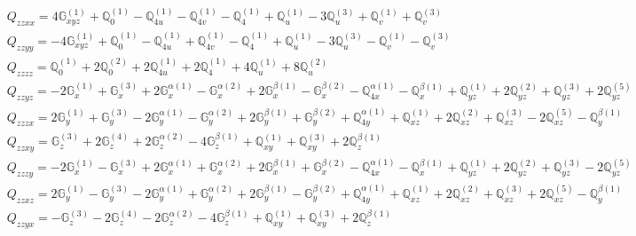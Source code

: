 \documentclass[fleqn,8pt,landscape]{jsarticle}
\begin{document}
\begin{align*}
& Q_{zzxx} = 4 \mathbb{G}_{xyz}^{(1)} + \mathbb{Q}_{0}^{(1)} - \mathbb{Q}_{4u}^{(1)} - \mathbb{Q}_{4v}^{(1)} - \mathbb{Q}_{4}^{(1)} + \mathbb{Q}_{u}^{(1)} - 3 \mathbb{Q}_{u}^{(3)} + \mathbb{Q}_{v}^{(1)} + \mathbb{Q}_{v}^{(3)} \\
& Q_{zzyy} = - 4 \mathbb{G}_{xyz}^{(1)} + \mathbb{Q}_{0}^{(1)} - \mathbb{Q}_{4u}^{(1)} + \mathbb{Q}_{4v}^{(1)} - \mathbb{Q}_{4}^{(1)} + \mathbb{Q}_{u}^{(1)} - 3 \mathbb{Q}_{u}^{(3)} - \mathbb{Q}_{v}^{(1)} - \mathbb{Q}_{v}^{(3)} \\
& Q_{zzzz} = \mathbb{Q}_{0}^{(1)} + 2 \mathbb{Q}_{0}^{(2)} + 2 \mathbb{Q}_{4u}^{(1)} + 2 \mathbb{Q}_{4}^{(1)} + 4 \mathbb{Q}_{u}^{(1)} + 8 \mathbb{Q}_{u}^{(2)} \\
& Q_{zzyz} = - 2 \mathbb{G}_{x}^{(1)} + \mathbb{G}_{x}^{(3)} + 2 \mathbb{G}_{x}^{\alpha(1)} - \mathbb{G}_{x}^{\alpha(2)} + 2 \mathbb{G}_{x}^{\beta(1)} - \mathbb{G}_{x}^{\beta(2)} - \mathbb{Q}_{4x}^{\alpha(1)} - \mathbb{Q}_{x}^{\beta(1)} + \mathbb{Q}_{yz}^{(1)} + 2 \mathbb{Q}_{yz}^{(2)} + \mathbb{Q}_{yz}^{(3)} + 2 \mathbb{Q}_{yz}^{(5)} \\
& Q_{zzzx} = 2 \mathbb{G}_{y}^{(1)} + \mathbb{G}_{y}^{(3)} - 2 \mathbb{G}_{y}^{\alpha(1)} - \mathbb{G}_{y}^{\alpha(2)} + 2 \mathbb{G}_{y}^{\beta(1)} + \mathbb{G}_{y}^{\beta(2)} + \mathbb{Q}_{4y}^{\alpha(1)} + \mathbb{Q}_{xz}^{(1)} + 2 \mathbb{Q}_{xz}^{(2)} + \mathbb{Q}_{xz}^{(3)} - 2 \mathbb{Q}_{xz}^{(5)} - \mathbb{Q}_{y}^{\beta(1)} \\
& Q_{zzxy} = \mathbb{G}_{z}^{(3)} + 2 \mathbb{G}_{z}^{(4)} + 2 \mathbb{G}_{z}^{\alpha(2)} - 4 \mathbb{G}_{z}^{\beta(1)} + \mathbb{Q}_{xy}^{(1)} + \mathbb{Q}_{xy}^{(3)} + 2 \mathbb{Q}_{z}^{\beta(1)} \\
& Q_{zzzy} = - 2 \mathbb{G}_{x}^{(1)} - \mathbb{G}_{x}^{(3)} + 2 \mathbb{G}_{x}^{\alpha(1)} + \mathbb{G}_{x}^{\alpha(2)} + 2 \mathbb{G}_{x}^{\beta(1)} + \mathbb{G}_{x}^{\beta(2)} - \mathbb{Q}_{4x}^{\alpha(1)} - \mathbb{Q}_{x}^{\beta(1)} + \mathbb{Q}_{yz}^{(1)} + 2 \mathbb{Q}_{yz}^{(2)} + \mathbb{Q}_{yz}^{(3)} - 2 \mathbb{Q}_{yz}^{(5)} \\
& Q_{zzxz} = 2 \mathbb{G}_{y}^{(1)} - \mathbb{G}_{y}^{(3)} - 2 \mathbb{G}_{y}^{\alpha(1)} + \mathbb{G}_{y}^{\alpha(2)} + 2 \mathbb{G}_{y}^{\beta(1)} - \mathbb{G}_{y}^{\beta(2)} + \mathbb{Q}_{4y}^{\alpha(1)} + \mathbb{Q}_{xz}^{(1)} + 2 \mathbb{Q}_{xz}^{(2)} + \mathbb{Q}_{xz}^{(3)} + 2 \mathbb{Q}_{xz}^{(5)} - \mathbb{Q}_{y}^{\beta(1)} \\
& Q_{zzyx} = - \mathbb{G}_{z}^{(3)} - 2 \mathbb{G}_{z}^{(4)} - 2 \mathbb{G}_{z}^{\alpha(2)} - 4 \mathbb{G}_{z}^{\beta(1)} + \mathbb{Q}_{xy}^{(1)} + \mathbb{Q}_{xy}^{(3)} + 2 \mathbb{Q}_{z}^{\beta(1)} \\

\end{align*}
\end{document}
